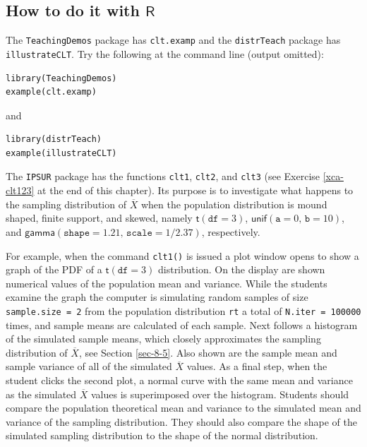 \documentclass[captions=tableheading]{scrbook}
\begin{document}
\subsection{How to do it with \(\mathsf{R}\)}
\label{sec-8-3-1}


The \texttt{TeachingDemos} package \cite{Snowteachingdemos} has \texttt{clt.examp} and the \texttt{distrTeach} \cite{Ruckdescheldistr} package has \texttt{illustrateCLT}. Try the following at the command line (output omitted):

\begin{verbatim}
library(TeachingDemos)
example(clt.examp)
\end{verbatim}
and

\begin{verbatim}
library(distrTeach)
example(illustrateCLT)
\end{verbatim}

The \texttt{IPSUR}  package has the functions \texttt{clt1}, \texttt{clt2}, and \texttt{clt3} (see Exercise \ref{xca-clt123} at the end of this chapter). Its purpose is to investigate what happens to the sampling distribution of \(\overline{X}\) when the population distribution is mound shaped, finite support, and skewed, namely \(\mathsf{t}(\mathtt{df}=3)\), \(\mathsf{unif}(\mathtt{a}=0,\,\mathtt{b}=10)\), and \(\mathsf{gamma}(\mathtt{shape}=1.21,\,\mathtt{scale}=1/2.37)\), respectively. 

For example, when the command \texttt{clt1()}  is issued a plot window opens to show a graph of the PDF of a \(\mathsf{t}(\mathtt{df}=3)\) distribution. On the display are shown numerical values of the population mean and variance. While the students examine the graph the computer is simulating random samples of size \texttt{sample.size = 2} from the population distribution \texttt{rt} a total of \texttt{N.iter = 100000} times, and sample means are calculated of each sample. Next follows a histogram of the simulated sample means, which closely approximates the sampling distribution of \(\overline{X}\), see Section \ref{sec-8-5}. Also shown are the sample mean and sample variance of all of the simulated  \( \overline{X} \) values. As a final step, when the student clicks the second plot, a normal curve with the same mean and variance as the simulated \( \overline{X} \) values is superimposed over the histogram. Students should compare the population theoretical mean and variance to the simulated mean and variance of the sampling distribution. They should also compare the shape of the simulated sampling distribution to the shape of the normal distribution.
\end{document}
